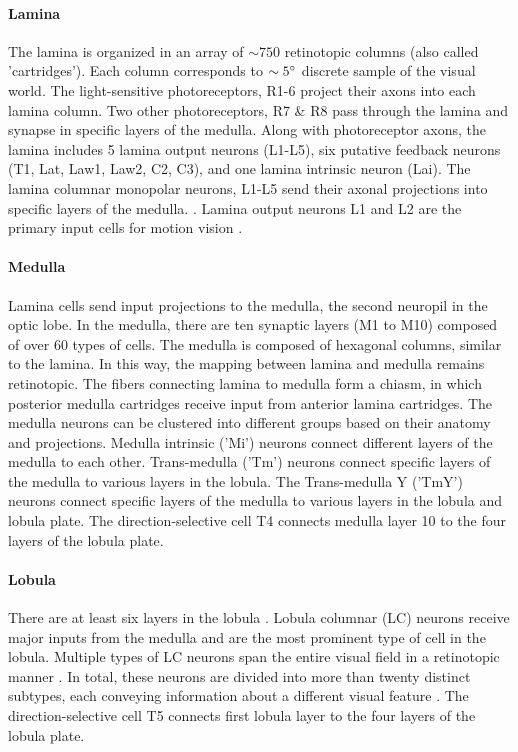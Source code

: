\paragraph{Lamina}
The lamina is organized in an array of $\sim 750$ retinotopic columns (also called 'cartridges'). Each column corresponds to $\sim 5\degree$ discrete sample of the visual world. The light-sensitive photoreceptors, R1-6 project their axons into each lamina column. Two other photoreceptors, R7 \& R8 pass through the lamina and synapse in specific layers of the medulla. Along with photoreceptor axons, the lamina includes 5 lamina output neurons (L1-L5), six putative feedback neurons (T1, Lat, Law1, Law2, C2, C3), and one lamina intrinsic neuron (Lai). The lamina columnar monopolar neurons, L1-L5 send their axonal projections into specific layers of the medulla. \parencite{Fischbach1989, Tuthill2013}. Lamina output neurons L1 and L2 are the primary input cells for motion vision \parencite{Zhu2013}.


\paragraph{Medulla}
Lamina cells send input projections to the medulla, the second neuropil in the optic lobe. In the medulla, there are ten synaptic layers (M1 to M10) composed of over 60 types of cells. The medulla is composed of hexagonal columns, similar to the lamina. In this way, the mapping between lamina and medulla remains retinotopic. The fibers connecting lamina to medulla form a chiasm, in which posterior medulla cartridges receive input from anterior lamina cartridges. The medulla neurons can be clustered into different groups based on their anatomy and projections. Medulla intrinsic ('Mi') neurons connect different layers of the medulla to each other. Trans-medulla ('Tm') neurons connect specific layers of the medulla to various layers in the lobula. The Trans-medulla Y ('TmY') neurons connect specific layers of the medulla to various layers in the lobula and lobula plate. The direction-selective cell T4 connects medulla layer 10 to the four layers of the lobula plate.

\paragraph{Lobula}
There are at least six layers in the lobula \parencite{Fischbach1989}. Lobula columnar (LC) neurons receive major inputs from the medulla and are the most prominent type of cell in the lobula. Multiple types of LC neurons span the entire visual field in a retinotopic manner \parencite{Otsuna2006}. In total, these neurons are divided into more than twenty distinct subtypes, each conveying information about a different visual feature \parencite{Wu2016}. The direction-selective cell T5 connects first lobula layer to the four layers of the lobula plate.

